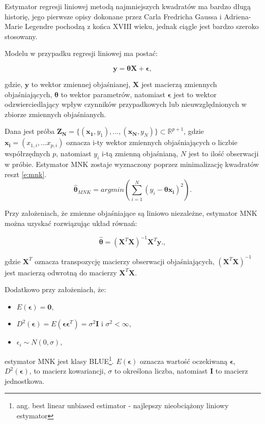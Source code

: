 \documentclass[man,mfu]{mgrwms}
\begin{document}
Estymator regresji liniowej metodą najmniejszych kwadratów ma bardzo długą historię, jego pierwsze opisy dokonane przez Carla Fredricha Gaussa  i Adriena-Marie Legendre pochodzą z końca XVIII wieku, jednak ciągle jest bardzo szeroko stosowany.

Modelu w przypadku regresji liniowej ma postać:

\begin{equation}
\mathbf{y} = \mathbf{\theta} \mathbf{X} + \mathbf{\epsilon},
\end{equation}

gdzie, $\mathbf{y}$ to wektor zmiennej objaśnianej, $\mathbf{X}$ jest macierzą zmiennych objaśniających, $\mathbf{\theta}$ to wektor parametrów, natomiast $\mathbf{\epsilon}$ jest to wektor odzwierciedlający wpływ czynników przypadkowych lub nieuwzględnionych w zbiorze zmiennych objaśnianych.

Dana jest próba $\mathbf{Z_N} = \{(\mathbf{x_1},y_1),...,(\mathbf{x_N},y_N)\} \subset \mathbb{R}^{p+1}$, gdzie $\mathbf{x_i} = (x_{1,i},...x_{p,i})$ oznacza i-ty wektor zmiennych objaśniających o liczbie współrzędnych $p$, natomiast $y_i$ i-tą zmienną objaśnianą, $N$ jest to ilość obserwacji w próbie. Estymator MNK zostaje wyznaczony poprzez minimalizację kwadratów reszt \ref{e:mnk}.
\begin{equation}\label{e:mnk}
\mathbf{\hat{\theta}}_{MNK} = argmin(\sum^N_{i=1}(y_i-\mathbf{\theta} \mathbf{x_i})^2).
\end{equation}

Przy założeniach, że zmienne objaśniające są liniowo niezależne, estymator MNK można uzyskać rozwiązując układ równań:

\begin{equation}
\mathbf{\hat{\theta}} = (\mathbf{X}^T\mathbf{X})^{-1}\mathbf{X}^T\mathbf{y}.
\label{equ:est_mnk},
\end{equation}

gdzie $\mathbf{X}^T$ oznacza transpozycję macierzy obserwacji objaśniających, $(\mathbf{X}^T\mathbf{X})^{-1}$ jest macierzą odwrotną do macierzy $\mathbf{X}^T\mathbf{X}$.

Dodatkowo przy założeniach, że:
\begin{itemize}
\item $E(\mathbf{\epsilon})=\mathbf{0}$,
\item $D^2(\mathbf{\epsilon}) = E(\mathbf{\epsilon\epsilon}^T) = \sigma^2\mathbf{I}$ i $\sigma^2<\infty$,
\item $\epsilon_i \sim N(0,\sigma)$,
\end{itemize}
estymator MNK jest klasy BLUE\footnote{ang. 
best linear unbiased estimator - najlepszy nieobciążony liniowy estymator}. $E(\mathbf{\epsilon})$ oznacza wartość oczekiwaną $\mathbf{\epsilon}$, $D^2(\mathbf{\epsilon})$, to macierz kowariancji, $\sigma$ to określona liczba, natomiast $\mathbf{I}$ to macierz jednostkowa.
\end{document}
